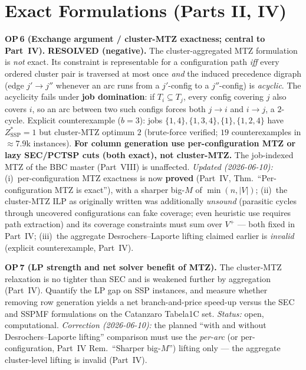 \documentclass[11pt,a4paper]{article}
\newcommand{\ZSSP}{Z_{\mathrm{SSP}}^{*}}
\begin{document}
\section{Exact Formulations (Parts II, IV)}
\begin{op}
\textbf{OP\,6 (Exchange argument / cluster-MTZ exactness; central to Part~IV).} \textbf{RESOLVED (negative).} The cluster-aggregated MTZ formulation is \emph{not} exact. Its constraint is representable for a configuration path \emph{iff} every ordered cluster pair is traversed at most once \emph{and} the induced precedence digraph (edge $j'\!\to\!j''$ whenever an arc runs from a $j'$-config to a $j''$-config) is \emph{acyclic}. The acyclicity fails under \textbf{job domination}: if $T_i\subseteq T_j$, every config covering $j$ also covers $i$, so an arc between two such configs forces both $j\!\to\!i$ and $i\!\to\!j$, a $2$-cycle. Explicit counterexample ($b=3$): jobs $\{1,4\},\{1,3,4\},\{1\},\{1,2,4\}$ have $\ZSSP=1$ but cluster-MTZ optimum $2$ (brute-force verified; $19$ counterexamples in $\approx7.9$k instances). \textbf{For column generation use per-configuration MTZ or lazy SEC/PCTSP cuts (both exact), not cluster-MTZ.} The job-indexed MTZ of the BBC master (Part~VIII) is unaffected.
\emph{Updated (2026-06-10):} (i)~per-configuration MTZ exactness is now
\textbf{proved} (Part~IV, Thm.\ ``Per-configuration MTZ is exact''), with a
sharper big-$M$ of $\min(n,|V|)$; (ii)~the cluster-MTZ ILP as originally written
was additionally \emph{unsound} (parasitic cycles through uncovered
configurations can fake coverage; even heuristic use requires path extraction)
and its coverage constraints must sum over $V^{+}$ --- both fixed in Part~IV;
(iii)~the aggregate Desrochers--Laporte lifting claimed earlier is
\emph{invalid} (explicit counterexample, Part~IV).
\end{op}
\begin{op}
\textbf{OP\,7 (LP strength and net solver benefit of MTZ).} The cluster-MTZ relaxation is no
tighter than SEC and is weakened further by aggregation (Part~IV). Quantify the LP gap on SSP
instances, and measure whether removing row
generation yields a net branch-and-price speed-up versus the SEC and SSPMF formulations on the
Catanzaro Tabela1C set. \emph{Status:} open, computational.
\emph{Correction (2026-06-10):} the planned ``with and without
Desrochers--Laporte lifting'' comparison must use the \emph{per-arc} (or
per-configuration, Part~IV Rem.\ ``Sharper big-$M$'') lifting only --- the
aggregate cluster-level lifting is invalid (Part~IV).
\end{op}
\end{document}
